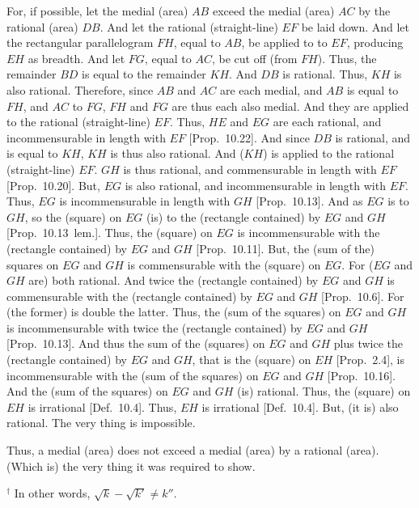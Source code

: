 \begin{Parallel}{}{}
{For, if possible, let the medial (area) $AB$ exceed the medial (area) $AC$
by the rational (area) $DB$. And let the rational (straight-line)
$EF$ be laid down. And let the rectangular parallelogram $FH$, equal to $AB$, be
applied to to $EF$, producing $EH$ as breadth. And let $FG$, equal to
$AC$, be cut off (from $FH$). Thus, the remainder $BD$
is equal to the remainder $KH$. And $DB$ is rational. Thus, $KH$
is also rational. Therefore, since $AB$ and $AC$ are each medial, and
$AB$ is equal to $FH$, and $AC$ to $FG$, $FH$ and $FG$ are thus each also medial. And they are applied to the rational (straight-line)
$EF$. Thus, $HE$ and $EG$ are each rational, and incommensurable
in length with $EF$ [Prop.~10.22]. 
And since $DB$ is rational, and is equal to $KH$, $KH$ is thus  also
rational. And ($KH$) is  applied to the rational (straight-line)
$EF$. $GH$ is thus rational, and commensurable in length with
$EF$ [Prop.~10.20]. But, $EG$ is also
rational, and incommensurable in length with $EF$. Thus, $EG$ is
incommensurable in length with $GH$ [Prop.~10.13]. And as $EG$ is to $GH$, so the
(square) on $EG$ (is) to the (rectangle contained) by $EG$ and
$GH$ [Prop.~10.13~lem.]. Thus, the (square)
on $EG$ is incommensurable with the (rectangle contained) by 
$EG$ and $GH$ [Prop.~10.11]. 
But, the (sum of the) squares on $EG$ and $GH$ is commensurable with
the (square) on $EG$. For ($EG$ and $GH$ are) both rational.
And twice the (rectangle contained) by $EG$ and $GH$ is commensurable
with the (rectangle contained) by $EG$ and $GH$ [Prop.~10.6]. For (the former) is double the latter.
Thus, the (sum of the squares) on $EG$ and $GH$ is incommensurable
with twice the (rectangle contained) by $EG$ and $GH$
[Prop.~10.13]. 
And thus the sum of the (squares) on $EG$ and $GH$ plus twice the (rectangle contained) by
$EG$ and $GH$, that is the (square) on $EH$ [Prop.~2.4], is incommensurable with the (sum
of the squares) on $EG$ and $GH$ [Prop.~10.16].
And the (sum of the squares) on $EG$ and $GH$ (is) rational. 
Thus, the (square) on $EH$ is irrational [Def.~10.4].
Thus, $EH$ is irrational  [Def.~10.4]. But,
(it is) also rational. The very thing is impossible.

Thus, a medial (area) does not exceed a medial
(area) by a rational (area). (Which is) the very thing it was required to show.}
\end{Parallel}
{\footnotesize\noindent$^\dag$ In other words, $\sqrt{k}-\sqrt{k'}\neq k''$.}


